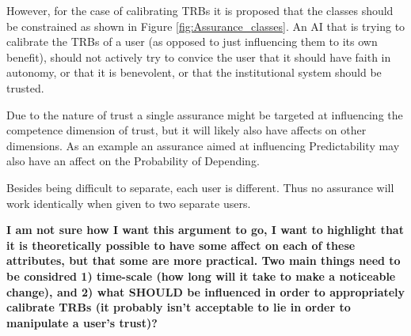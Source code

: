     However, for the case of calibrating TRBs it is proposed that the classes should be constrained as shown in Figure \ref{fig:Assurance_classes}. An AI that is trying to calibrate the TRBs of a user (as opposed to just influencing them to its own benefit), should not actively try to convice the user that it should have faith in autonomy, or that it is benevolent, or that the institutional system should be trusted.

    Due to the nature of trust a single assurance might be targeted at influencing the competence dimension of trust, but it will likely also have affects on other dimensions. As an example an assurance aimed at influencing Predictability may also have an affect on the Probability of Depending.

    Besides being difficult to separate, each user is different. Thus no assurance will work identically when given to two separate users.

    \textbf{I am not sure how I want this argument to go, I want to highlight that it is theoretically possible to have some affect on each of these attributes, but that some are more practical. Two main things need to be considred 1) time-scale (how long will it take to make a noticeable change), and 2) what SHOULD be influenced in order to appropriately calibrate TRBs (it probably isn't acceptable to lie in order to manipulate a user's trust)?}
    


